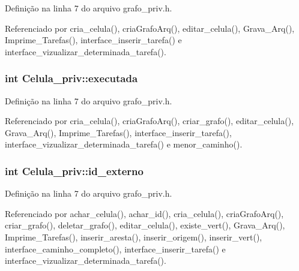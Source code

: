 Definição na linha 7 do arquivo grafo\+\_\+priv.\+h.



Referenciado por cria\+\_\+celula(), cria\+Grafo\+Arq(), editar\+\_\+celula(), Grava\+\_\+\+Arq(), Imprime\+\_\+\+Tarefas(), interface\+\_\+inserir\+\_\+tarefa() e interface\+\_\+vizualizar\+\_\+determinada\+\_\+tarefa().

\hypertarget{structCelula__priv_af5f995caad41372e844f965021c5d183}{}
\subsubsection[{executada}]{\setlength{\rightskip}{0pt plus 5cm}int Celula\+\_\+priv\+::executada}\label{structCelula__priv_af5f995caad41372e844f965021c5d183}


Definição na linha 7 do arquivo grafo\+\_\+priv.\+h.



Referenciado por cria\+\_\+celula(), cria\+Grafo\+Arq(), criar\+\_\+grafo(), editar\+\_\+celula(), Grava\+\_\+\+Arq(), Imprime\+\_\+\+Tarefas(), interface\+\_\+inserir\+\_\+tarefa(), interface\+\_\+vizualizar\+\_\+determinada\+\_\+tarefa() e menor\+\_\+caminho().

\hypertarget{structCelula__priv_a78a8525da28e1918d0faaf127001bd7b}{}
\subsubsection[{id\+\_\+externo}]{\setlength{\rightskip}{0pt plus 5cm}int Celula\+\_\+priv\+::id\+\_\+externo}\label{structCelula__priv_a78a8525da28e1918d0faaf127001bd7b}


Definição na linha 7 do arquivo grafo\+\_\+priv.\+h.



Referenciado por achar\+\_\+celula(), achar\+\_\+id(), cria\+\_\+celula(), cria\+Grafo\+Arq(), criar\+\_\+grafo(), deletar\+\_\+grafo(), editar\+\_\+celula(), existe\+\_\+vert(), Grava\+\_\+\+Arq(), Imprime\+\_\+\+Tarefas(), inserir\+\_\+aresta(), inserir\+\_\+origem(), inserir\+\_\+vert(), interface\+\_\+caminho\+\_\+completo(), interface\+\_\+inserir\+\_\+tarefa() e interface\+\_\+vizualizar\+\_\+determinada\+\_\+tarefa().

